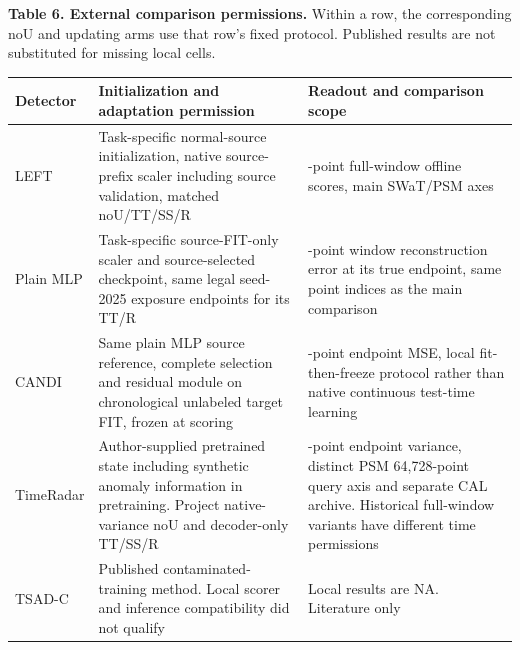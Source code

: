 \documentclass[
  american,
]{article}
\begin{document}
\textbf{Table 6. External comparison permissions.} Within a row, the
corresponding noU and updating arms use that row's fixed protocol.
Published results are not substituted for missing local cells.

\begin{longtable}[]{@{}
  >{\raggedright\arraybackslash}p{}
  >{\raggedright\arraybackslash}p{}
  >{\raggedright\arraybackslash}p{}@{}}
\toprule\noalign{}
\begin{minipage}[b]{\linewidth}\raggedright
Detector
\end{minipage} & \begin{minipage}[b]{\linewidth}\raggedright
Initialization and adaptation permission
\end{minipage} & \begin{minipage}[b]{\linewidth}\raggedright
Readout and comparison scope
\end{minipage} \\
\midrule\noalign{}
\endhead
\bottomrule\noalign{}
\endlastfoot
LEFT & Task-specific normal-source initialization, native source-prefix
scaler including source validation, matched noU/TT/SS/R & 192-point
full-window offline scores, main SWaT/PSM axes \\
Plain MLP & Task-specific source-FIT-only scaler and source-selected
checkpoint, same legal seed-2025 exposure endpoints for its TT/R &
10-point window reconstruction error at its true endpoint, same point
indices as the main comparison \\
CANDI & Same plain MLP source reference, complete selection and residual
module on chronological unlabeled target FIT, frozen at scoring &
10-point endpoint MSE, local fit-then-freeze protocol rather than native
continuous test-time learning \\
TimeRadar & Author-supplied pretrained state including synthetic anomaly
information in pretraining. Project native-variance noU and decoder-only
TT/SS/R & 100-point endpoint variance, distinct PSM 64,728-point query
axis and separate CAL archive. Historical full-window variants have
different time permissions \\
TSAD-C & Published contaminated-training method. Local scorer and
inference compatibility did not qualify & Local results are NA.
Literature only \\
\end{longtable}
\end{document}
